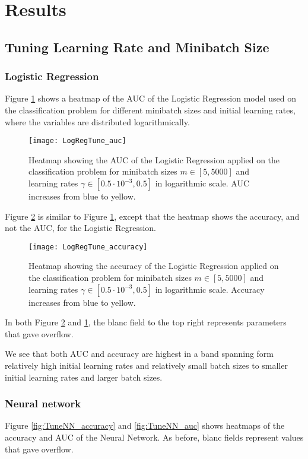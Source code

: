 \section{Results}
\label{sec:results}

\subsection{Tuning Learning Rate and Minibatch Size}

\subsubsection*{Logistic Regression}
Figure \ref{fig:TuneLogReg_auc} shows a heatmap of the AUC of the Logistic Regression model used on the classification problem for different minibatch sizes and initial learning rates, where the variables are distributed logarithmically.
\begin{figure}[htbp]
	\centering
	\texttt{[image: LogRegTune\_auc]}
	\caption{Heatmap showing the AUC of the Logistic Regression applied on the classification problem for minibatch sizes $m\in[5, 5000]$ and learning rates $\gamma\in[0.5\cdot10^{-3}, 0.5]$ in logarithmic scale. AUC increases from blue to yellow.}
	\label{fig:TuneLogReg_auc}
\end{figure}

Figure \ref{fig:TuneLogReg_accuracy} is similar to Figure \ref{fig:TuneLogReg_auc}, except that the heatmap shows the accuracy, and not the AUC, for the Logistic Regression.
\begin{figure}[htbp]
	\centering
	\texttt{[image: LogRegTune\_accuracy]}
	\caption{Heatmap showing the accuracy of the Logistic Regression applied on the classification problem for minibatch sizes $m\in[5, 5000]$ and learning rates $\gamma\in[0.5\cdot10^{-3}, 0.5]$ in logarithmic scale. Accuracy increases from blue to yellow.}
	\label{fig:TuneLogReg_accuracy}
\end{figure}

In both Figure \ref{fig:TuneLogReg_accuracy} and \ref{fig:TuneLogReg_auc}, the blanc field to the top right represents parameters that gave overflow.

We see that both AUC and accuracy are highest in a band spanning form relatively high initial learning rates and relatively small batch sizes to smaller initial learning rates and larger batch sizes.

\subsubsection*{Neural network}
Figure \ref{fig:TuneNN_accuracy} and \ref{fig:TuneNN_auc} shows heatmaps of the accuracy and AUC of the Neural Network. As before, blanc fields represent values that gave overflow.

